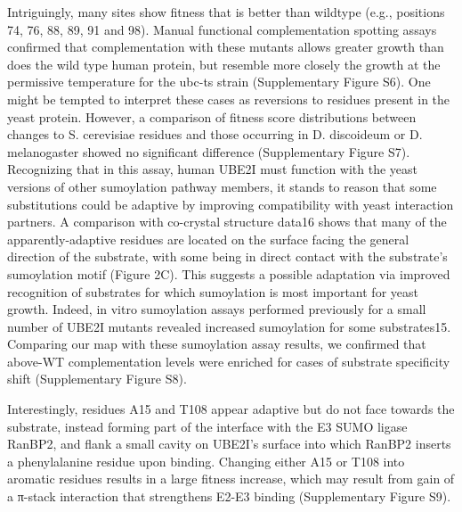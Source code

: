 Intriguingly, many sites show fitness that is better than wildtype (e.g., positions 74, 76, 88, 89, 91 and 98). Manual functional complementation spotting assays confirmed that complementation with these mutants allows greater growth than does the wild type human protein, but resemble more closely the growth at the permissive temperature for the ubc-ts strain (Supplementary Figure S6). One might be tempted to interpret these cases as reversions to residues present in the yeast protein. However, a comparison of fitness score distributions between changes to S. cerevisiae  residues and those occurring in D. discoideum or D. melanogaster showed no significant difference (Supplementary Figure S7). Recognizing that in this assay, human UBE2I must function with the yeast versions of other sumoylation pathway members, it stands to reason that some substitutions could be adaptive by improving compatibility with yeast interaction partners. A comparison with co-crystal structure data16 shows that many of the apparently-adaptive residues are located on the surface facing the general direction of the substrate, with some being in direct contact with the substrate’s sumoylation motif (Figure 2C). This suggests a possible adaptation via improved recognition of substrates for which sumoylation is most important for yeast growth. Indeed, in vitro sumoylation assays performed previously for a small number of UBE2I mutants revealed increased sumoylation for some substrates15. Comparing our map with these sumoylation assay results, we confirmed that above-WT complementation levels were enriched for cases of substrate specificity shift (Supplementary Figure S8).

Interestingly, residues A15 and T108 appear adaptive but do not face towards the substrate, instead forming part of the interface with the E3 SUMO ligase RanBP2, and flank a small cavity on UBE2I’s surface into which RanBP2 inserts a phenylalanine residue upon binding. Changing either A15 or T108 into aromatic residues results in a large fitness increase, which may result from gain of a π-stack interaction that strengthens E2-E3 binding (Supplementary Figure S9).

